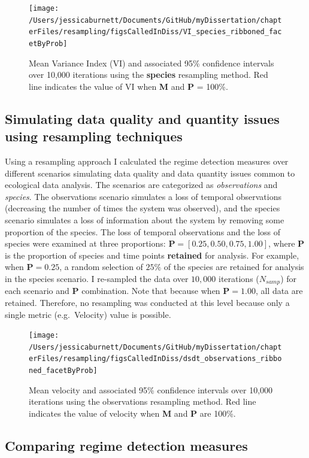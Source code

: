 \documentclass[12pt,twoside,openany]{reedthesis}
\begin{document}
\begin{figure}[bth]

{\centering \texttt{[image: /Users/jessicaburnett/Documents/GitHub/myDissertation/chapterFiles/resampling/figsCalledInDiss/VI\_species\_ribboned\_facetByProb]} 

}

\caption{Mean Variance Index (VI) and associated 95\% confidence intervals over 10,000 iterations using the \textbf{species} resampling method. Red line indicates the value of VI when \textbf{M} and \textbf{P} = 100\%.}\label{fig:viResamp2}
\end{figure}
\hypertarget{simulating-data-quality-and-quantity-issues-using-resampling-techniques}{%
\subsection{Simulating data quality and quantity issues using resampling techniques}\label{simulating-data-quality-and-quantity-issues-using-resampling-techniques}}

Using a resampling approach I calculated the regime detection measures over different scenarios simulating data quality and data quantity issues common to ecological data analysis. The scenarios are categorized as \emph{observations} and \emph{species}. The observations scenario simulates a loss of temporal observations (decreasing the number of times the system was observed), and the species scenario simulates a loss of information about the system by removing some proportion of the species. The loss of temporal observations and the loss of species were examined at three proportions: \(\textbf{P} = [0.25, 0.50, 0.75, 1.00]\), where \(\textbf{P}\) is the proportion of species and time points \textbf{retained} for analysis. For example, when \(\textbf{P} = 0.25\), a random selection of \(25\%\) of the species are retained for analysis in the species scenario. I re-sampled the data over \(10,000\) iterations (\(N_{samp}\)) for each scenario and \(\textbf{P}\) combination. Note that because when \(\textbf{P} = 1.00\), all data are retained. Therefore, no resampling was conducted at this level because only a single metric (e.g.~Velocity) value is possible.

\begin{figure}[bth]

{\centering \texttt{[image: /Users/jessicaburnett/Documents/GitHub/myDissertation/chapterFiles/resampling/figsCalledInDiss/dsdt\_observations\_ribboned\_facetByProb]} 

}

\caption{Mean velocity and associated 95\% confidence intervals over 10,000 iterations using the observations resampling method. Red line indicates the value of velocity when \textbf{M} and \textbf{P} are 100\%.}\label{fig:dsdtResamp}
\end{figure}
\hypertarget{comparing-regime-detection-measures}{%
\subsection{Comparing regime detection measures}\label{comparing-regime-detection-measures}}
\end{document}
